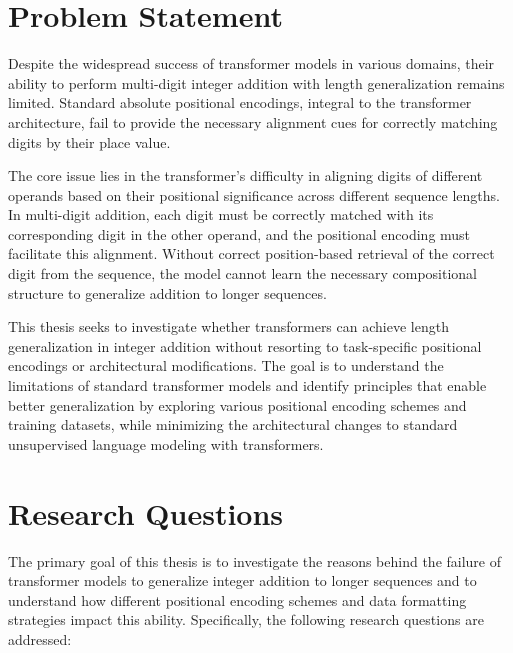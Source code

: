 \section{Problem Statement}

Despite the widespread success of transformer models in various domains, their ability to perform multi-digit integer addition with length generalization remains limited. Standard absolute positional encodings, integral to the transformer architecture, fail to provide the necessary alignment cues for correctly matching digits by their place value.

The core issue lies in the transformer's difficulty in aligning digits of different operands based on their positional significance across different sequence lengths. In multi-digit addition, each digit must be correctly matched with its corresponding digit in the other operand, and the positional encoding must facilitate this alignment. Without correct position-based retrieval of the correct digit from the sequence, the model cannot learn the necessary compositional structure to generalize addition to longer sequences.

This thesis seeks to investigate whether transformers can achieve length generalization in integer addition without resorting to task-specific positional encodings or architectural modifications. The goal is to understand the limitations of standard transformer models and identify principles that enable better generalization by exploring various positional encoding schemes and training datasets, while minimizing the architectural changes to standard unsupervised language modeling with transformers.

\section{Research Questions}\label{sec:research_questions}

The primary goal of this thesis is to investigate the reasons behind the failure of transformer models to generalize integer addition to longer sequences and to understand how different positional encoding schemes and data formatting strategies impact this ability. Specifically, the following research questions are addressed:


